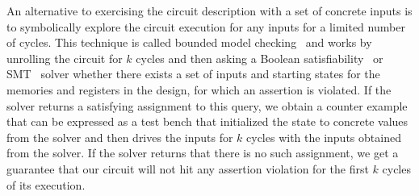 \documentclass[conference]{IEEEtran}
\begin{document}
An alternative to exercising the circuit description with a set of concrete inputs is to symbolically explore the circuit execution
for any inputs for a limited number of cycles.
This technique is called bounded model checking~\cite{bmc} and works by unrolling the circuit for $k$ cycles and then asking a 
Boolean satisfiability~\cite{sat} or SMT~\cite{smt} solver whether there exists a set of inputs and starting states for the memories and registers in the
design, for which an assertion is violated.
If the solver returns a satisfying assignment to this query, we obtain a counter example that can be expressed as a test bench that
initialized the state to concrete values from the solver and then drives the inputs for $k$ cycles with the inputs obtained from the solver.
If the solver returns that there is no such assignment, we get a guarantee that our circuit will not hit any assertion violation for the first $k$
cycles of its execution.
\end{document}
